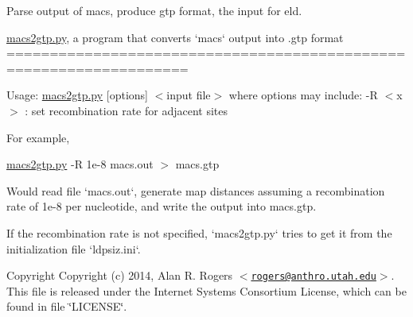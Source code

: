 \-Parse output of macs, produce gtp format, the input for eld.

\hyperlink{macs2gtp_8py}{macs2gtp.\-py}, a program that converts `macs` output into .gtp format ===================================================================

\-Usage\-: \hyperlink{macs2gtp_8py}{macs2gtp.\-py} \mbox{[}options\mbox{]} $<$input file$>$ where options may include\-: -\/\-R $<$x$>$ \-: set recombination rate for adjacent sites

\-For example,

\hyperlink{macs2gtp_8py}{macs2gtp.\-py} -\/\-R 1e-\/8 macs.\-out $>$ macs.\-gtp

\-Would read file `macs.out`, generate map distances assuming a recombination rate of 1e-\/8 per nucleotide, and write the output into macs.\-gtp.

\-If the recombination rate is not specified, `macs2gtp.py` tries to get it from the initialization file `ldpsiz.ini`.

\begin{DoxyCopyright}{\-Copyright}
\-Copyright (c) 2014, \-Alan \-R. \-Rogers $<$\href{mailto:rogers@anthro.utah.edu}{\tt rogers@anthro.\-utah.\-edu}$>$. \-This file is released under the \-Internet \-Systems \-Consortium \-License, which can be found in file \char`\"{}\-L\-I\-C\-E\-N\-S\-E\char`\"{}. 
\end{DoxyCopyright}
